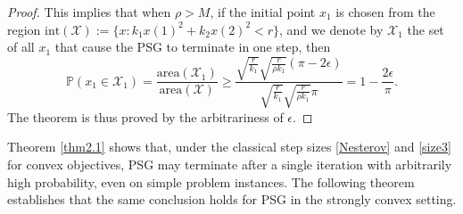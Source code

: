\documentclass[sn-mathphys]{JORSC-jnl}%
\theoremstyle{thmstyleone}%
\theoremstyle{thmstylethree}%
\begin{document}
\begin{proof}
	This implies that when $\rho > M$, if the initial point $x_1$ is chosen from the region $\text{int}(\mathcal{X}) := \{ x : k_1 x(1)^2 + k_2 x(2)^2 < r \}$, and we denote by $\mathcal{X}_1$ the set of all $x_1$ that cause the PSG to terminate in one step, then
	\begin{equation*}
		\mathbb{P}\left(x_1 \in \mathcal{X}_1\right) = \dfrac{\text{area}(\mathcal{X}_1)}{\text{area}(\mathcal{X})} \geq \dfrac{\sqrt{\frac{r}{k_1}}\sqrt{\frac{r}{\rho k_1}}(\pi-2\epsilon)}{\sqrt{\frac{r}{k_1}}\sqrt{\frac{r}{\rho k_1}}\pi} = 1 - \frac{2\epsilon}{\pi}.
	\end{equation*}
	The theorem is thus proved by the arbitrariness of $\epsilon$.
\end{proof}

Theorem \ref{thm2.1} shows that, under the classical step sizes \eqref{Nesterov} and \eqref{size3} for convex objectives, PSG may terminate after a single iteration with arbitrarily high probability, even on simple problem instances. The following theorem establishes that the same conclusion holds for PSG in the strongly convex setting.
 
\end{document}
